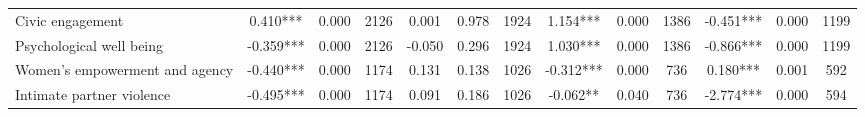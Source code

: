 \begin{tabular}{l*{12}{c}}
 Civic engagement &        0.410*** &        0.000 & 2126    &        0.001 &        0.978 & 1924    &        1.154*** &        0.000 & 1386 &       -0.451*** &        0.000 & 1199 \\ 

 Psychological well being &       -0.359*** &        0.000 & 2126    &       -0.050 &        0.296 & 1924    &        1.030*** &        0.000 & 1386 &       -0.866*** &        0.000 & 1199 \\ 

 Women's empowerment and agency &       -0.440*** &        0.000 & 1174    &        0.131 &        0.138 & 1026    &       -0.312*** &        0.000 & 736 &        0.180*** &        0.001 & 592 \\ 

 Intimate partner violence &       -0.495*** &        0.000 & 1174    &        0.091 &        0.186 & 1026    &       -0.062** &        0.040 & 736 &       -2.774*** &        0.000 & 594 \\ 

\hline \end{tabular}
